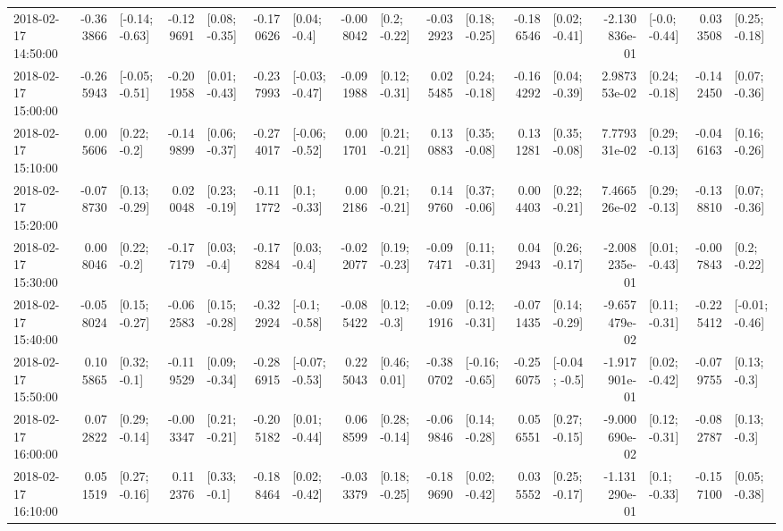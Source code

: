 \begin{tabular}{lrlrlrlrlrlrlrlrl}
2018-02-17 14:50:00 & -0.363866 &  [-0.14; -0.63] & -0.129691 &   [0.08; -0.35] & -0.170626 &    [0.04; -0.4] & -0.008042 &    [0.2; -0.22] & -0.032923 &   [0.18; -0.25] & -0.186546 &   [0.02; -0.41] & -2.130836e-01 &   [-0.0; -0.44] &  0.033508 &   [0.25; -0.18] \\
2018-02-17 15:00:00 & -0.265943 &  [-0.05; -0.51] & -0.201958 &   [0.01; -0.43] & -0.237993 &  [-0.03; -0.47] & -0.091988 &   [0.12; -0.31] &  0.025485 &   [0.24; -0.18] & -0.164292 &   [0.04; -0.39] &  2.987353e-02 &   [0.24; -0.18] & -0.142450 &   [0.07; -0.36] \\
2018-02-17 15:10:00 &  0.005606 &    [0.22; -0.2] & -0.149899 &   [0.06; -0.37] & -0.274017 &  [-0.06; -0.52] &  0.001701 &   [0.21; -0.21] &  0.130883 &   [0.35; -0.08] &  0.131281 &   [0.35; -0.08] &  7.779331e-02 &   [0.29; -0.13] & -0.046163 &   [0.16; -0.26] \\
2018-02-17 15:20:00 & -0.078730 &   [0.13; -0.29] &  0.020048 &   [0.23; -0.19] & -0.111772 &    [0.1; -0.33] &  0.002186 &   [0.21; -0.21] &  0.149760 &   [0.37; -0.06] &  0.004403 &   [0.22; -0.21] &  7.466526e-02 &   [0.29; -0.13] & -0.138810 &   [0.07; -0.36] \\
2018-02-17 15:30:00 &  0.008046 &    [0.22; -0.2] & -0.177179 &    [0.03; -0.4] & -0.178284 &    [0.03; -0.4] & -0.022077 &   [0.19; -0.23] & -0.097471 &   [0.11; -0.31] &  0.042943 &   [0.26; -0.17] & -2.008235e-01 &   [0.01; -0.43] & -0.007843 &    [0.2; -0.22] \\
2018-02-17 15:40:00 & -0.058024 &   [0.15; -0.27] & -0.062583 &   [0.15; -0.28] & -0.322924 &   [-0.1; -0.58] & -0.085422 &    [0.12; -0.3] & -0.091916 &   [0.12; -0.31] & -0.071435 &   [0.14; -0.29] & -9.657479e-02 &   [0.11; -0.31] & -0.225412 &  [-0.01; -0.46] \\
2018-02-17 15:50:00 &  0.105865 &    [0.32; -0.1] & -0.119529 &   [0.09; -0.34] & -0.286915 &  [-0.07; -0.53] &  0.225043 &    [0.46; 0.01] & -0.380702 &  [-0.16; -0.65] & -0.256075 &   [-0.04; -0.5] & -1.917901e-01 &   [0.02; -0.42] & -0.079755 &    [0.13; -0.3] \\
2018-02-17 16:00:00 &  0.072822 &   [0.29; -0.14] & -0.003347 &   [0.21; -0.21] & -0.205182 &   [0.01; -0.44] &  0.068599 &   [0.28; -0.14] & -0.069846 &   [0.14; -0.28] &  0.056551 &   [0.27; -0.15] & -9.000690e-02 &   [0.12; -0.31] & -0.082787 &    [0.13; -0.3] \\
2018-02-17 16:10:00 &  0.051519 &   [0.27; -0.16] &  0.112376 &    [0.33; -0.1] & -0.188464 &   [0.02; -0.42] & -0.033379 &   [0.18; -0.25] & -0.189690 &   [0.02; -0.42] &  0.035552 &   [0.25; -0.17] & -1.131290e-01 &    [0.1; -0.33] & -0.157100 &   [0.05; -0.38] \\

\end{tabular}

